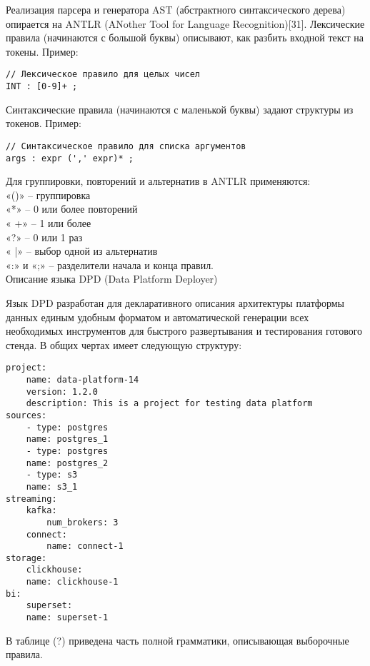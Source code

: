 Реализация парсера и генератора AST (абстрактного синтаксического дерева) опирается на ANTLR (ANother Tool for Language Recognition)[31].
Лексические правила (начинаются с большой буквы) описывают, как разбить входной текст на токены.
Пример:
\begin{verbatim}
// Лексическое правило для целых чисел
INT : [0-9]+ ; 
\end{verbatim}
Синтаксические правила (начинаются с маленькой буквы) задают структуры из токенов.
Пример:
\begin{verbatim}
// Синтаксическое правило для списка аргументов
args : expr (',' expr)* ; 

\end{verbatim}
Для группировки, повторений и альтернатив в ANTLR применяются:\\
«()» – группировка\\
«*» – 0 или более повторений\\
« +» – 1 или более\\
«?» – 0 или 1 раз\\
« |» – выбор одной из альтернатив\\
«:» и «;» – разделители начала и конца правил.\\

Описание языка DPD (Data Platform Deployer)

Язык DPD  разработан для  декларативного описания архитектуры платформы данных единым удобным форматом и автоматической генерации всех необходимых инструментов для быстрого развертывания и тестирования готового стенда. В общих чертах имеет следующую структуру:
\begin{verbatim}
project:
    name: data-platform-14
    version: 1.2.0
    description: This is a project for testing data platform
sources:
    - type: postgres
    name: postgres_1
    - type: postgres
    name: postgres_2
    - type: s3
    name: s3_1
streaming:
    kafka:
        num_brokers: 3
    connect:
        name: connect-1
storage:
    clickhouse:
    name: clickhouse-1
bi:
    superset:
    name: superset-1
\end{verbatim}
В таблице (?)  приведена часть полной грамматики, описывающая
выборочные правила.\\

